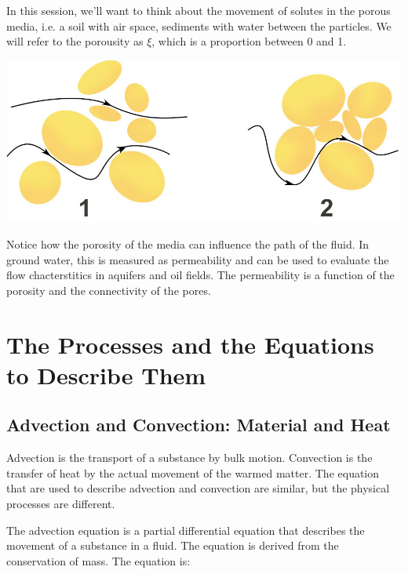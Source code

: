 \documentclass{tufte-handout}\usepackage[]{graphicx}\usepackage[]{xcolor}
\begin{document}
In this session, we'll want to think about the movement of solutes in the porous media, i.e. a soil with air space, sediments with water between the particles. We will refer to the porousity as $\xi$, which is a proportion between 0 and 1. 

\begin{marginfigure}
\centering
\includegraphics{graphics/Darcy_permeability.jpg}
\caption{Notice how the porosity of the media can influence the path of the fluid. In ground water, this is measured as permeability and can be used to evaluate the flow chacterstitics in aquifers and oil fields. The permeability is a function of the porosity and the connectivity of the pores.}
\end{marginfigure}


\section{The Processes and the Equations to Describe Them}

\subsection{Advection and Convection: Material and Heat}

Advection is the transport of a substance by bulk motion. Convection is the transfer of heat by the actual movement of the warmed matter. The equation that are used to describe advection and convection are similar, but the physical processes are different.


The advection equation is a partial differential equation that describes the movement of a substance in a fluid. The equation is derived from the conservation of mass. The equation is:
\end{document}
